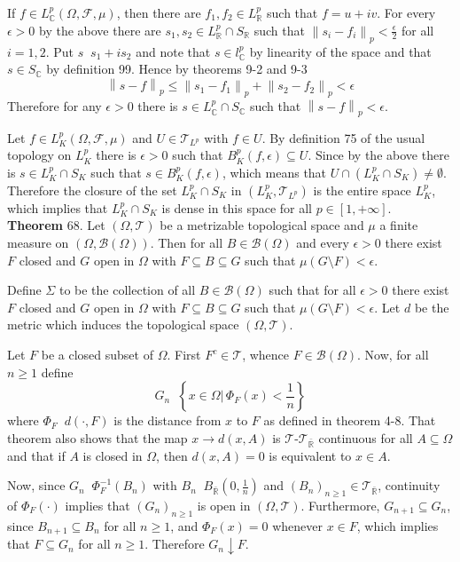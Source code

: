 \documentclass[a4paper]{article}
\newcommand{\obj}[1]{\left\{ #1 \right \}}
\newcommand{\clo}[1]{\left [ #1 \right ]}
\newcommand{\brac}[1]{\left ( #1 \right )}
\newcommand{\induc}[1]{\left . #1 \right \vert}
\newcommand{\nrm}[1]{\left\| #1 \right \|}
\newcommand{\Rbar}{{\bar{\mathbb{R}}}}
\newcommand{\Real}{\mathbb{R}}
\newcommand{\Cplx}{\mathbb{C}}
\newcommand{\Tcal}{\mathcal{T}}
\newcommand{\Fcal}{\mathcal{F}}
\newcommand{\borel}[1]{\mathcal{B}\brac{#1}}
\newcommand{\defn}{\mathop{\overset{\Delta}{=}}\nolimits}
\begin{document}
If $f\in L^p_\Cplx\brac{\Omega,\Fcal,\mu}$, then there are $f_1,f_2\in L^p_\Real$ such that $f = u + i v$. For every $\epsilon>0$ by the above there are $s_1, s_2\in L^p_\Real\cap S_\Real$ such that $\nrm{s_i-f_i}_p < \frac{\epsilon}{2}$ for all $i=1,2$. Put $s\defn s_1 + i s_2$ and note that $s\in l^p_\Cplx$ by linearity of the space and that $s\in S_\Cplx$ by definition 99. Hence by theorems 9-2 and 9-3 \[\nrm{s-f}_p\leq \nrm{s_1-f_1}_p + \nrm{s_2-f_2}_p < \epsilon\] Therefore for any $\epsilon>0$ there is $s\in L^p_\Cplx\cap S_\Cplx$ such that $\nrm{s-f}_p<\epsilon$.

Let $f\in L^p_K\brac{\Omega,\Fcal,\mu}$ and $U\in \Tcal_{L^p}$ with $f\in U$. By definition 75 of the usual topology on $L^p_K$ there is $\epsilon>0$ such that $B^p_K\brac{f,\epsilon}\subseteq U$. Since by the above there is $s\in L^p_K\cap S_K$ such that $s\in B^p_K\brac{f,\epsilon}$, which means that $U\cap \brac{L^p_K\cap S_K}\neq \emptyset$. Therefore the closure of the set $L^p_K\cap S_K$ in $\brac{L^p_K, \Tcal_{L^p}}$ is the entire space $L^p_K$, which implies that $L^p_K\cap S_K$ is dense in this space for all $p\in\clo{1, +\infty}$.\\

\label{thm:topo_meas_space} \noindent \textbf{Theorem} 68.
Let $\brac{\Omega, \Tcal}$ be a metrizable topological space and $\mu$ a finite measure on $\brac{\Omega, \borel{\Omega}}$. Then for all $B\in \borel{\Omega}$ and every $\epsilon>0$ there exist $F$ closed and $G$ open in $\Omega$ with $F\subseteq B \subseteq G$ such that $\mu\brac{G\setminus F}< \epsilon$.

Define $\Sigma$ to be the collection of all $B\in \borel{\Omega}$ such that for all $\epsilon>0$ there exist $F$ closed and $G$ open in $\Omega$ with $F\subseteq B \subseteq G$ such that $\mu\brac{G\setminus F}< \epsilon$. Let $d$ be the metric which induces the topological space $\brac{\Omega, \Tcal}$.

Let $F$ be a closed subset of $\Omega$. First $F^c\in \Tcal$, whence $F\in \borel{\Omega}$. Now, for all $n\geq1$ define \[G_n\defn \obj{ \induc{x\in \Omega}\,\Phi_F\brac{x}<\frac{1}{n} }\] where $\Phi_F\defn d\brac{\cdot,F}$ is the distance from $x$ to $F$ as defined in theorem 4-8. That theorem also shows that the map $x\to d\brac{x,A}$ is $\Tcal$-$\Tcal_\Rbar$ continuous for all $A\subseteq \Omega$ and that if $A$ is closed in $\Omega$, then $d\brac{x,A}=0$ is equivalent to $x\in A$.

Now, since $G_n \defn \Phi_F^{-1}\brac{B_n}$ with $B_n\defn B_\Rbar\brac{0,\frac{1}{n}}$ and $\brac{B_n}_{n\geq1}\in \Tcal_\Rbar$, continuity of $\Phi_F\brac{\cdot}$ implies that $\brac{G_n}_{n\geq1}$ is open in $\brac{\Omega, \Tcal}$. Furthermore, $G_{n+1}\subseteq G_n$, since $B_{n+1}\subseteq B_n$ for all $n\geq1$, and $\Phi_F\brac{x}=0$ whenever $x\in F$, which implies that $F\subseteq G_n$ for all $n\geq1$. Therefore $G_n\downarrow F$.
\end{document}

